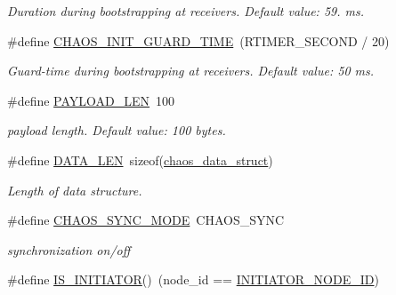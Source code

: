 \begin{DoxyCompactItemize}
\begin{DoxyCompactList}\small\item\em Duration during bootstrapping at receivers. Default value\-: 59. ms. \end{DoxyCompactList}\item 
\hypertarget{group__chaos-test-settings_ga1f0aaac6ffeb7477d0718d1cfacdf4a1}{\#define \hyperlink{group__chaos-test-settings_ga1f0aaac6ffeb7477d0718d1cfacdf4a1}{C\-H\-A\-O\-S\-\_\-\-I\-N\-I\-T\-\_\-\-G\-U\-A\-R\-D\-\_\-\-T\-I\-M\-E}~(R\-T\-I\-M\-E\-R\-\_\-\-S\-E\-C\-O\-N\-D / 20)}\label{group__chaos-test-settings_ga1f0aaac6ffeb7477d0718d1cfacdf4a1}

\begin{DoxyCompactList}\small\item\em Guard-\/time during bootstrapping at receivers. Default value\-: 50 ms. \end{DoxyCompactList}\item 
\hypertarget{group__chaos-test-settings_ga212a14606599edd2c69298c5cffa64a0}{\#define \hyperlink{group__chaos-test-settings_ga212a14606599edd2c69298c5cffa64a0}{P\-A\-Y\-L\-O\-A\-D\-\_\-\-L\-E\-N}~100}\label{group__chaos-test-settings_ga212a14606599edd2c69298c5cffa64a0}

\begin{DoxyCompactList}\small\item\em payload length. Default value\-: 100 bytes. \end{DoxyCompactList}\item 
\hypertarget{group__chaos-test-defines_gaf02e45f15080b8ec9dd7b286157617ff}{\#define \hyperlink{group__chaos-test-defines_gaf02e45f15080b8ec9dd7b286157617ff}{D\-A\-T\-A\-\_\-\-L\-E\-N}~sizeof(\hyperlink{structchaos__data__struct}{chaos\-\_\-data\-\_\-struct})}\label{group__chaos-test-defines_gaf02e45f15080b8ec9dd7b286157617ff}

\begin{DoxyCompactList}\small\item\em Length of data structure. \end{DoxyCompactList}\item 
\hypertarget{group__chaos-test-defines_ga4033ccadc530529ac8bc59d83d36b727}{\#define \hyperlink{group__chaos-test-defines_ga4033ccadc530529ac8bc59d83d36b727}{C\-H\-A\-O\-S\-\_\-\-S\-Y\-N\-C\-\_\-\-M\-O\-D\-E}~C\-H\-A\-O\-S\-\_\-\-S\-Y\-N\-C}\label{group__chaos-test-defines_ga4033ccadc530529ac8bc59d83d36b727}

\begin{DoxyCompactList}\small\item\em synchronization on/off \end{DoxyCompactList}\item 
\hypertarget{group__chaos-test-defines_ga3d1e7d432a1b08c6c103a999b1dc76df}{\#define \hyperlink{group__chaos-test-defines_ga3d1e7d432a1b08c6c103a999b1dc76df}{I\-S\-\_\-\-I\-N\-I\-T\-I\-A\-T\-O\-R}()~(node\-\_\-id == \hyperlink{group__chaos-test-settings_ga2e373237aef3ee2b0fdb15cd0b8c5390}{I\-N\-I\-T\-I\-A\-T\-O\-R\-\_\-\-N\-O\-D\-E\-\_\-\-I\-D})}\label{group__chaos-test-defines_ga3d1e7d432a1b08c6c103a999b1dc76df}


\end{DoxyCompactItemize}
